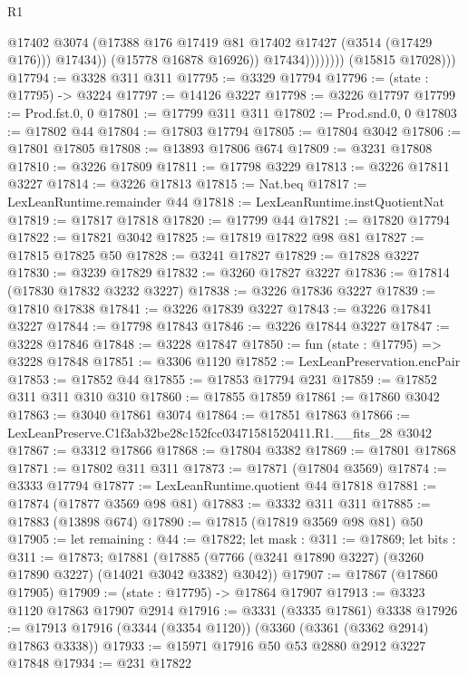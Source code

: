 \begin{lexlean}{R1}
\begin{coremodule}
                              @17402
                              @3074
                              (@17388 @176 @17419 @81 @17402 @17427 (@3514 (@17429 @176)))
                              @17434))
                          (@15778 @16878 @16926))
                        @17434))))))))
        (@15815 @17028)))
@17794 := @3328 @311 @311
@17795 := @3329 @17794
@17796 := (state : @17795) -> @3224
@17797 := @14126 @3227
@17798 := @3226 @17797
@17799 := Prod.fst.{0, 0}
@17801 := @17799 @311 @311
@17802 := Prod.snd.{0, 0}
@17803 := @17802 @44
@17804 := @17803 @17794
@17805 := @17804 @3042
@17806 := @17801 @17805
@17808 := @13893 @17806 @674
@17809 := @3231 @17808
@17810 := @3226 @17809
@17811 := @17798 @3229
@17813 := @3226 @17811 @3227
@17814 := @3226 @17813
@17815 := Nat.beq
@17817 := LexLeanRuntime.remainder @44
@17818 := LexLeanRuntime.instQuotientNat
@17819 := @17817 @17818
@17820 := @17799 @44
@17821 := @17820 @17794
@17822 := @17821 @3042
@17825 := @17819 @17822 @98 @81
@17827 := @17815 @17825 @50
@17828 := @3241 @17827
@17829 := @17828 @3227
@17830 := @3239 @17829
@17832 := @3260 @17827 @3227
@17836 := @17814 (@17830 @17832 @3232 @3227)
@17838 := @3226 @17836 @3227
@17839 := @17810 @17838
@17841 := @3226 @17839 @3227
@17843 := @3226 @17841 @3227
@17844 := @17798 @17843
@17846 := @3226 @17844 @3227
@17847 := @3228 @17846
@17848 := @3228 @17847
@17850 := fun (state : @17795) => @3228 @17848
@17851 := @3306 @1120
@17852 := LexLeanPreservation.encPair
@17853 := @17852 @44
@17855 := @17853 @17794 @231
@17859 := @17852 @311 @311 @310 @310
@17860 := @17855 @17859
@17861 := @17860 @3042
@17863 := @3040 @17861 @3074
@17864 := @17851 @17863
@17866 := LexLeanPreserve.C1f3ab32be28c152fcc03471581520411.R1.__fits_28 @3042
@17867 := @3312 @17866
@17868 := @17804 @3382
@17869 := @17801 @17868
@17871 := @17802 @311 @311
@17873 := @17871 (@17804 @3569)
@17874 := @3333 @17794
@17877 := LexLeanRuntime.quotient @44 @17818
@17881 := @17874 (@17877 @3569 @98 @81)
@17883 := @3332 @311 @311
@17885 := @17883 (@13898 @674)
@17890 := @17815 (@17819 @3569 @98 @81) @50
@17905 := let remaining : @44 := @17822;
  let mask : @311 := @17869;
  let bits : @311 := @17873;
  @17881 (@17885 (@7766 (@3241 @17890 @3227) (@3260 @17890 @3227) (@14021 @3042 @3382) @3042))
@17907 := @17867 (@17860 @17905)
@17909 := (state : @17795) -> @17864 @17907
@17913 := @3323 @1120 @17863 @17907 @2914
@17916 := @3331 (@3335 @17861) @3338
@17926 := @17913 @17916 (@3344 (@3354 @1120)) (@3360 (@3361 (@3362 @2914) @17863 @3338))
@17933 := @15971 @17916 @50 @53 @2880 @2912 @3227 @17848
@17934 := @231 @17822

\end{coremodule}
\end{lexlean}
